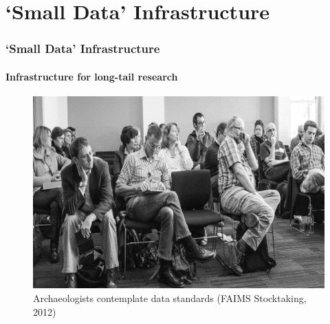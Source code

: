 

\section{`Small Data' Infrastructure}

\begin{sectionframe} %
	\frametitle{`Small Data' Infrastructure}
	\framesubtitle{Infrastructure for long-tail research}

 \begin{figure}[H]
    \centering
        \vspace{-0.5cm}
        \includegraphics[height=.6\textheight]{figures/Archaeologists-standards.png}
        \caption{Archaeologists contemplate data standards (FAIMS Stocktaking, 2012)}
        \label{fig:figure7}
 \end{figure}
\end{sectionframe}


